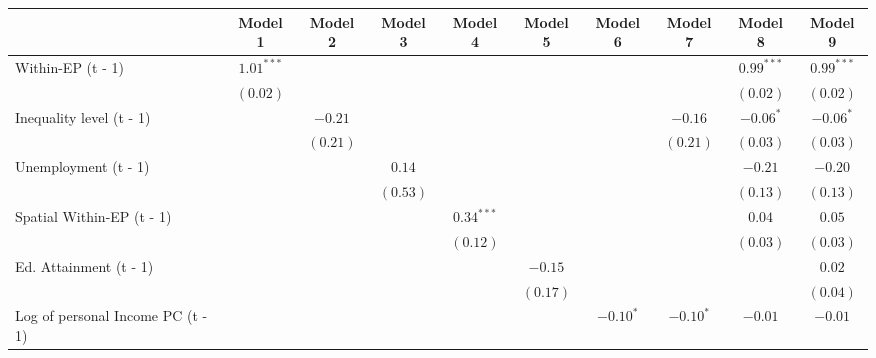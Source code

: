 
\begin{table}
\begin{center}
\begin{tabular}{l c c c c c c c c c}
\hline
 & Model 1 & Model 2 & Model 3 & Model 4 & Model 5 & Model 6 & Model 7 & Model 8 & Model 9 \\
\hline
Within-EP (t - 1)                 & $1.01^{***}$ &              &              &              &              &              &              & $0.99^{***}$ & $0.99^{***}$ \\
                                  & $(0.02)$     &              &              &              &              &              &              & $(0.02)$     & $(0.02)$     \\
Inequality level (t - 1)          &              & $-0.21$      &              &              &              &              & $-0.16$      & $-0.06^{*}$  & $-0.06^{*}$  \\
                                  &              & $(0.21)$     &              &              &              &              & $(0.21)$     & $(0.03)$     & $(0.03)$     \\
Unemployment (t - 1)              &              &              & $0.14$       &              &              &              &              & $-0.21$      & $-0.20$      \\
                                  &              &              & $(0.53)$     &              &              &              &              & $(0.13)$     & $(0.13)$     \\
Spatial Within-EP (t - 1)         &              &              &              & $0.34^{***}$ &              &              &              & $0.04$       & $0.05$       \\
                                  &              &              &              & $(0.12)$     &              &              &              & $(0.03)$     & $(0.03)$     \\
Ed. Attainment (t - 1)            &              &              &              &              & $-0.15$      &              &              &              & $0.02$       \\
                                  &              &              &              &              & $(0.17)$     &              &              &              & $(0.04)$     \\
Log of personal Income PC (t - 1) &              &              &              &              &              & $-0.10^{*}$  & $-0.10^{*}$  & $-0.01$      & $-0.01$      \\

\end{tabular}
\end{center}
\end{table}
